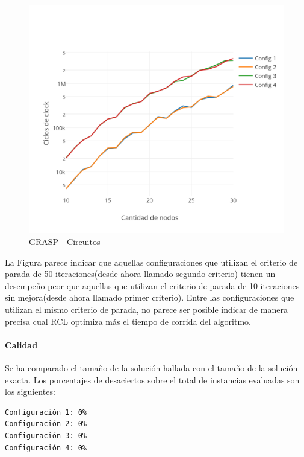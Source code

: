 \begin{figure}[htb]
	\begin{center}
    		\includegraphics[scale=0.8]{imagenes/grasp-circuitos-tiempo.png}
	\end{center}
	\caption{GRASP - Circuitos}\label{fig:4A}
\end{figure}

La Figura parece indicar que aquellas configuraciones que utilizan el criterio de parada de 50 iteraciones(desde ahora llamado segundo criterio) tienen un desempeño peor que aquellas que utilizan el criterio de parada de 10 iteraciones sin mejora(desde ahora llamado primer criterio). Entre las configuraciones que utilizan el mismo criterio de parada, no parece ser posible indicar de manera precisa cual RCL optimiza más el tiempo de corrida del algoritmo.

\paragraph{Calidad} Se ha comparado el tamaño de la solución hallada con el tamaño de la solución exacta.  Los porcentajes de desaciertos sobre el total de instancias evaluadas son los siguientes:

\begin{verbatim}
Configuración 1: 0%
Configuración 2: 0%
Configuración 3: 0%
Configuración 4: 0%
\end{verbatim}

